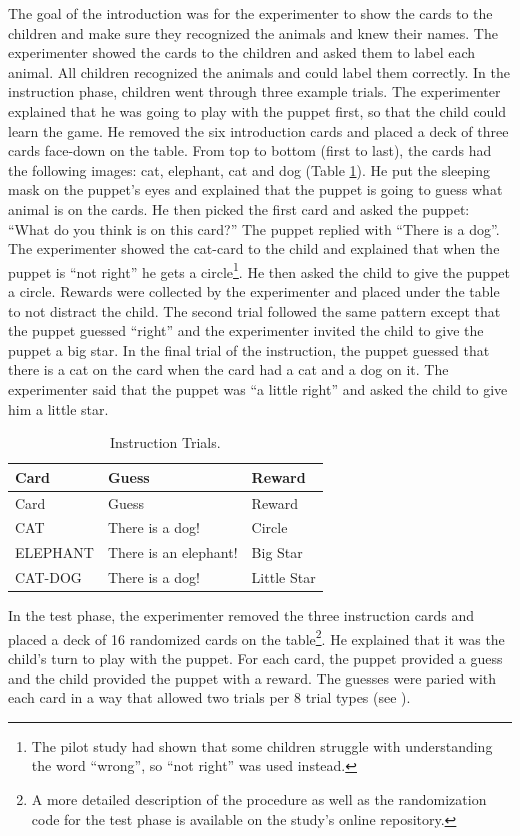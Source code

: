 \documentclass[floatsintext,man]{apa6}
\theoremstyle{definition}
\theoremstyle{definition}
\theoremstyle{definition}
\theoremstyle{remark}
\begin{document}
The goal of the introduction was for the experimenter to show the cards
to the children and make sure they recognized the animals and knew their
names. The experimenter showed the cards to the children and asked them
to label each animal. All children recognized the animals and could
label them correctly. In the instruction phase, children went through
three example trials. The experimenter explained that he was going to
play with the puppet first, so that the child could learn the game. He
removed the six introduction cards and placed a deck of three cards
face-down on the table. From top to bottom (first to last), the cards
had the following images: cat, elephant, cat and dog (Table
\ref{tab:instruction}). He put the sleeping mask on the puppet's eyes
and explained that the puppet is going to guess what animal is on the
cards. He then picked the first card and asked the puppet: \enquote{What
do you think is on this card?} The puppet replied with \enquote{There is
a dog}. The experimenter showed the cat-card to the child and explained
that when the puppet is \enquote{not right} he gets a circle\footnote{The
  pilot study had shown that some children struggle with understanding
  the word \enquote{wrong}, so \enquote{not right} was used instead.}.
He then asked the child to give the puppet a circle. Rewards were
collected by the experimenter and placed under the table to not distract
the child. The second trial followed the same pattern except that the
puppet guessed \enquote{right} and the experimenter invited the child to
give the puppet a big star. In the final trial of the instruction, the
puppet guessed that there is a cat on the card when the card had a cat
and a dog on it. The experimenter said that the puppet was \enquote{a
little right} and asked the child to give him a little star.

\begin{longtable}[]{@{}lll@{}}
\caption{\label{tab:instruction} Instruction Trials.}\tabularnewline
\toprule
Card & Guess & Reward\tabularnewline
\midrule
\endfirsthead
\toprule
Card & Guess & Reward\tabularnewline
\midrule
\endhead
CAT & There is a dog! & Circle\tabularnewline
ELEPHANT & There is an elephant! & Big Star\tabularnewline
CAT-DOG & There is a dog! & Little Star\tabularnewline
\bottomrule
\end{longtable}

In the test phase, the experimenter removed the three instruction cards
and placed a deck of 16 randomized cards on the table\footnote{A more
  detailed description of the procedure as well as the randomization
  code for the test phase is available on the study's online repository.}.
He explained that it was the child's turn to play with the puppet. For
each card, the puppet provided a guess and the child provided the puppet
with a reward. The guesses were paried with each card in a way that
allowed two trials per 8 trial types (see ).
\end{document}
